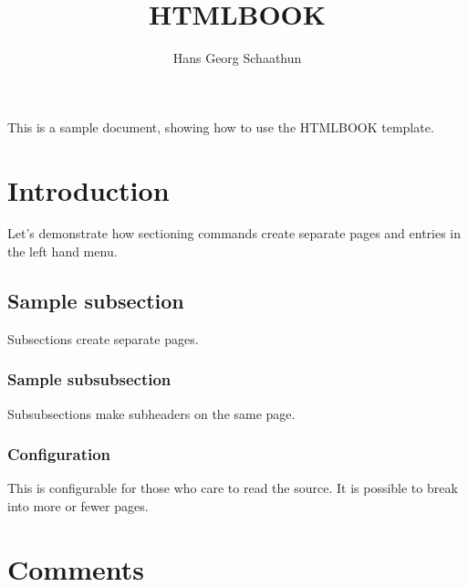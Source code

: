 \documentclass[12pt,nynorsk]{scrartcl}
\title{HTMLBOOK}
\subtitle{}
\author{Hans Georg Schaathun}
\begin{document}
%

This is a sample document, showing how to use the HTMLBOOK template.

\section{Introduction}

Let's demonstrate how sectioning commands create separate pages and 
entries in the left hand menu.

\subsection{Sample subsection}

Subsections create separate pages.

\subsubsection{Sample subsubsection}

Subsubsections make subheaders on the same page.

\subsubsection{Configuration}

This is configurable for those who care to read the source. It is
possible to break into more or fewer pages.

\section{Comments}
\end{document}
